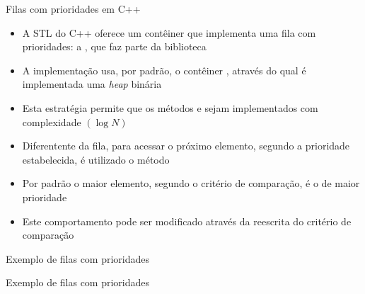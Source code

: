 \begin{frame}[fragile]{Filas com prioridades em C++}

    \begin{itemize}
        \item A STL do C++ oferece um contêiner que implementa uma fila com prioridades: a
            , que faz parte da biblioteca 

        \item A implementação usa, por padrão, o contêiner , através do qual é
            implementada uma \textit{heap} binária

        \item Esta estratégia permite que os métodos  e  sejam
            implementados com complexidade $(\log N)$

        \item Diferentente da fila, para acessar o próximo elemento, segundo a
            prioridade estabelecida, é utilizado o método 

        \item Por padrão o maior elemento, segundo o critério de comparação, é o de maior 
            prioridade

        \item Este comportamento pode ser modificado através da reescrita do critério de
            comparação
    \end{itemize}

\end{frame}

\begin{frame}[fragile]{Exemplo de filas com prioridades}
\end{frame}

\begin{frame}[fragile]{Exemplo de filas com prioridades}
\end{frame}
